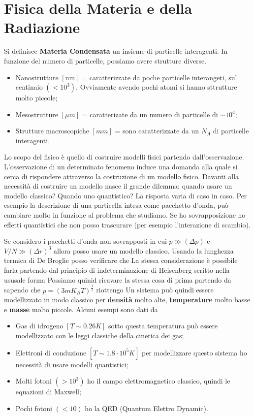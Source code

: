 \documentclass[a4paper,12pt]{article}
\begin{document}
\section{Fisica della Materia e della Radiazione}
Si definisce \textbf{Materia Condensata} un insieme di particelle interagenti. In funzione del numero di particelle, possiamo avere strutture diverse.
\begin{itemize}
	\item Nanostrutture $[\text{nm}]$ = caratterizzate da poche particelle interangeti, sul centinaio $(<10^3)$. Ovviamente avendo pochi atomi si hanno sttrutture molto piccole;
	\item Mesostrutture $[\mu m]$ = caratterizate da un numero di particelle di $\sim  10^4$;
	\item Strutture macroscopiche $[mm]$ = sono caratterizzate da un $N_A$ di particelle interagenti.
\end{itemize}
Lo scopo del fisico è quello di costruire modelli fisici partendo dall'osservazione. L'osservazione di un determinato fenomeno induce una domanda alla quale si cerca di rispondere attraverso la costruzione di un modello fisico. Davanti alla necessità di costruire un modello nasce il grande dilemma: quando usare un modello classico? Quando uno quantistico? La risposta varia di caso in caso. Per esempio la descrizione di una particella intesa come pacchetto d'onda, può cambiare molto in funzione al problema che studiamo. Se ho sovrapposizione ho effetti quantistici che non posso trascurare (per esempio l'interazione di scambio).

Se considero i pacchetti d'onda non sovrapposti in cui $p\gg (\Delta p)$ e  $V/N \gg (\Delta r)^3$ allora posso usare un modello classico. Usando la lunghezza termica di De Broglie
posso verificare che 
La stessa considerazione è possibile farla partendo dal principio di indeterminazione di Heisenberg scritto nella ususale forma
Possiamo quinid ricavare la stessa cosa di prima partendo da
sapendo che $p=(3mK_BT)^{\frac{1}{2}}$ riottengo 
Un sistema può quindi essere modellizzato in modo classico per \textbf{densità} molto alte, \textbf{temperature} molto basse e \textbf{masse} molto piccole. Alcuni esempi sono dati da
\begin{itemize}
	\item Gas di idrogeno $[T\sim 0.26 K]$ sotto questa temperatura può essere modellizzato con le leggi classiche della cinetica dei gas;
	\item Elettroni di conduzione $[T \sim 1.8\cdot 10^5K]$ per modellizzare questo sistema ho necessità di usare modelli quantistici;
	\item Molti fotoni $(>10^3)$ ho il campo elettromagnetico classico, quindi le equazioni di Maxwell;
	\item Pochi fotoni $(<10)$ ho la QED (Quantum Elettro Dynamic).
\end{itemize}
\end{document}
